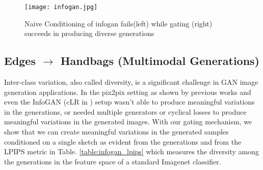 

\begin{figure}[t]
    \centering
    \texttt{[image: infogan.jpg]}
    \caption{Naive Conditioning of infogan fails(left) while gating (right) succeeds in producing diverse generations}\label{fig:infogan_gate}
    \vspace{-4mm}
\end{figure}

\subsection{Edges $\rightarrow$ Handbags (Multimodal Generations)}
Inter-class variation, also called diversity, is a significant challenge in GAN image generation applications. 
In the pix2pix setting as shown by previous works \cite{ghosh2017multi} and \cite{zhu2017toward} even the InfoGAN (cLR in \cite{zhu2017toward}) setup wasn't able to produce meaningful variations in the generations, or needed multiple generators or cyclical losses to produce meaningful variations in the generated images. 
With our gating mechanism, we show that we can create meaningful variations in the generated samples conditioned on a single sketch as evident from the generations  and from the LPIPS metric \cite{zhang2018unreasonable} in  Table. \ref{table:infogan_lpips} which measures the diversity among the generations in the feature space of a standard Imagenet classifier.

